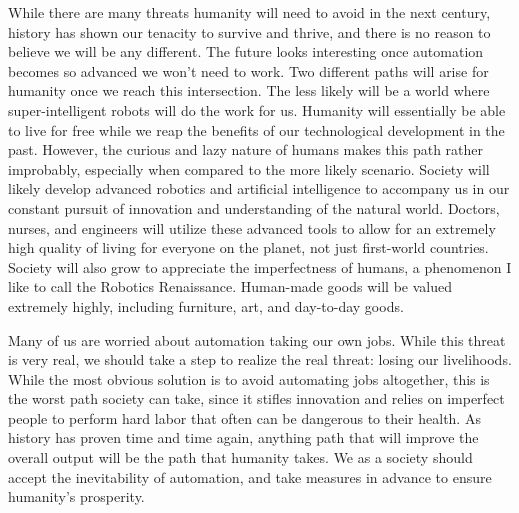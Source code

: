 While there are many threats humanity will need to avoid in the next century, history has shown our tenacity to survive and thrive, and there is no reason to believe we will be any different. The future looks interesting once automation becomes so advanced we won't need to work. Two different paths will arise for humanity once we reach this intersection. The less likely will be a world where super-intelligent robots will do the work for us. Humanity will essentially be able to live for free while we reap the benefits of our technological development in the past. However, the curious and lazy nature of humans makes this path rather improbably, especially when compared to the more likely scenario. Society will likely develop advanced robotics and artificial intelligence to accompany us in our constant pursuit of innovation and understanding of the natural world. Doctors, nurses, and engineers will utilize these advanced tools to allow for an extremely high quality of living for everyone on the planet, not just first-world countries. Society will also grow to appreciate the imperfectness of humans, a phenomenon I like to call the Robotics Renaissance. Human-made goods will be valued extremely highly, including furniture, art, and day-to-day goods.

Many of us are worried about automation taking our own jobs. While this threat is very real, we should take a step to realize the real threat: losing our livelihoods. While the most obvious solution is to avoid automating jobs altogether, this is the worst path society can take, since it stifles innovation and relies on imperfect people to perform hard labor that often can be dangerous to their health. As history has proven time and time again, anything path that will improve the overall output will be the path that humanity takes. We as a society should accept the inevitability of automation, and take measures in advance to ensure humanity's prosperity.